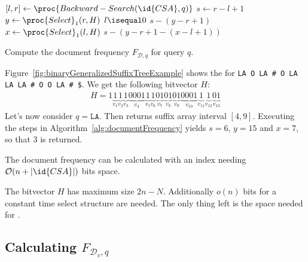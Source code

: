 \begin{algorithm}[htb]
  \begin{codebox}
    \li $[l,r] \gets \proc{Backward-Search(\id{CSA}, q)}$
    \li $s \gets r - l + 1$
    \li $y \gets \proc{Select}_1(r, H)$
    \li \If $l \isequal 0$
        \Then
    \li   \Return $s - (y - r + 1)$
    \li \Else
    \li   $x \gets \proc{Select}_1(l, H)$
    \li   \Return $s - (y - r + 1 - (x - l + 1))$
        \End
  \end{codebox}
  \caption{Compute the document frequency $F_{\mathcal{D},q}$ for query $q$.}
  \label{alg:documentFrequency}
\end{algorithm}

\begin{Example}
  Figure~\ref{fig:binaryGeneralizedSuffixTreeExample} shows the  for \texttt{LA O LA \# O LA LA LA \# O O LA \# \$}. We get the following bitvector $H$:
  \begin{align*}
    H = 1
    \underbrace{1}_{v_1}
    \underbrace{1}_{v_2}
    \underbrace{1}_{v_3}
    \underbrace{0001}_{v_4}
    \underbrace{1}_{v_5}
    \underbrace{1}_{v_6}
    \underbrace{01}_{v_7}
    \underbrace{01}_{v_8}
    \underbrace{01}_{v_9}
    \underbrace{0001}_{v_{10}}
    \underbrace{1}_{v_{11}}
    \underbrace{1}_{v_{12}}
    \underbrace{01}_{v_{13}}
  \end{align*}
  Let's now consider $q = \texttt{LA}$. Then  returns suffix array interval $[4,9]$. Executing the steps in Algorithm~\ref{alg:documentFrequency} yields $s = 6$, $y = 15$ and $x = 7$, so that $3$ is returned.
\end{Example}

\begin{Theorem}
  The document frequency can be calculated with an index needing $\mathcal{O}(n + \vert \id{CSA} \vert)$ bits space.
\end{Theorem}

\begin{Proof}
  The bitvector $H$ has maximum size $2n - N$. Additionally $o(n)$ bits for a constant time select structure are needed. The only thing left is the space needed for .
\end{Proof}

\subsection{Calculating $F_{\mathcal{D}_v, q}$}

